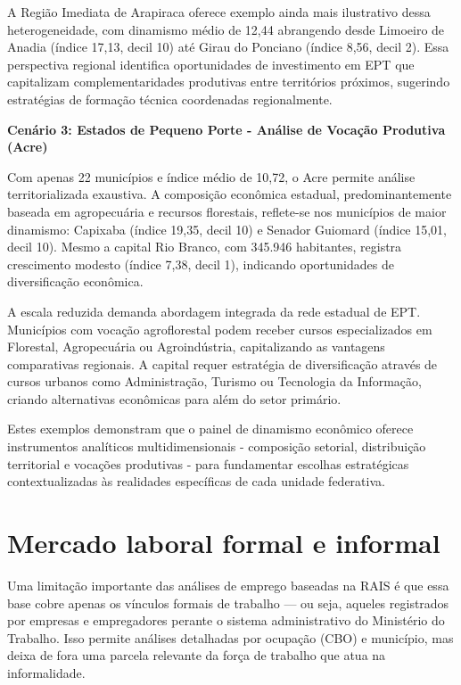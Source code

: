 A Região Imediata de Arapiraca oferece exemplo ainda mais ilustrativo dessa heterogeneidade, com dinamismo médio de 12,44 abrangendo desde Limoeiro de Anadia (índice 17,13, decil 10) até Girau do Ponciano (índice 8,56, decil 2). Essa perspectiva regional identifica oportunidades de investimento em EPT que capitalizam complementaridades produtivas entre territórios próximos, sugerindo estratégias de formação técnica coordenadas regionalmente.

\textbf{Cenário 3: Estados de Pequeno Porte - Análise de Vocação Produtiva (Acre)}

Com apenas 22 municípios e índice médio de 10,72, o Acre permite análise territorializada exaustiva. A composição econômica estadual, predominantemente baseada em agropecuária e recursos florestais, reflete-se nos municípios de maior dinamismo: Capixaba (índice 19,35, decil 10) e Senador Guiomard (índice 15,01, decil 10). Mesmo a capital Rio Branco, com 345.946 habitantes, registra crescimento modesto (índice 7,38, decil 1), indicando oportunidades de diversificação econômica.

A escala reduzida demanda abordagem integrada da rede estadual de EPT. Municípios com vocação agroflorestal podem receber cursos especializados em Florestal, Agropecuária ou Agroindústria, capitalizando as vantagens comparativas regionais. A capital requer estratégia de diversificação através de cursos urbanos como Administração, Turismo ou Tecnologia da Informação, criando alternativas econômicas para além do setor primário.

Estes exemplos demonstram que o painel de dinamismo econômico oferece instrumentos analíticos multidimensionais - composição setorial, distribuição territorial e vocações produtivas - para fundamentar escolhas estratégicas contextualizadas às realidades específicas de cada unidade federativa.

\section{Mercado laboral formal e informal} 


Uma limitação importante das análises de emprego baseadas na RAIS é que essa base cobre apenas os vínculos formais de trabalho — ou seja, aqueles registrados por empresas e empregadores perante o sistema administrativo do Ministério do Trabalho. Isso permite análises detalhadas por ocupação (CBO) e município, mas deixa de fora uma parcela relevante da força de trabalho que atua na informalidade.

